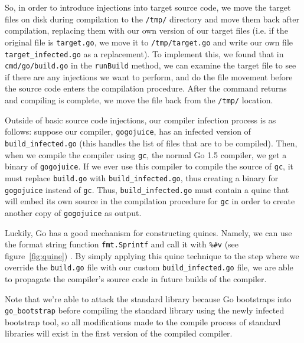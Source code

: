 \documentclass[10pt]{sigplanconf}
\begin{document}
\smallskip

So, in order to introduce injections into target source code, we move the target files on disk during compilation to the \texttt{/tmp/} directory and move them back after compilation, replacing them with our own version of our target files (i.e. if the original file is \texttt{target.go}, we move it to \texttt{/tmp/target.go} and write our own file \texttt{target\_infected.go} as a replacement). To implement this, we found that in \texttt{cmd/go/build.go} in the \texttt{runBuild} method, we can examine the target file to see if there are any injections we want to perform, and do the file movement before the source code enters the compilation procedure. After the command returns and compiling is complete, we move the file back from the \texttt{/tmp/} location.

\smallskip

Outside of basic source code injections, our compiler infection process is as follows: suppose our compiler, \texttt{gogojuice}, has an infected version of \texttt{build\_infected.go} (this handles the list of files that are to be compiled). Then, when we compile the compiler using \texttt{gc}, the normal Go 1.5 compiler, we get a binary of \texttt{gogojuice}. If we ever use this compiler to compile the source of \texttt{gc}, it must replace \texttt{build.go} with \texttt{build\_infected.go}, thus creating a binary for \texttt{gogojuice} instead of \texttt{gc}. Thus, \texttt{build\_infected.go} must contain a quine that will embed its own source in the compilation procedure for \texttt{gc} in order to create another copy of \texttt{gogojuice} as output.

\smallskip

Luckily, Go has a good mechanism for constructing quines. Namely, we can use the format string function \texttt{fmt.Sprintf} and call it with \texttt{\%\#v} (see figure~\ref{fig:quine}) \cite{quine}. By simply applying this quine technique to the step where we override the \texttt{build.go} file with our custom \texttt{build\_infected.go} file, we are able to propagate the compiler's source code in future builds of the compiler.

\smallskip

Note that we're able to attack the standard library because Go bootstraps into \texttt{go\_bootstrap} before compiling the standard library using the newly infected bootstrap tool, so all modifications made to the compile process of standard libraries will exist in the first version of the compiled compiler.
\end{document}
